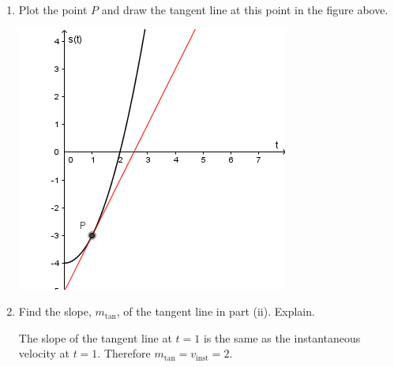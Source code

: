 \documentclass[nooutcomes]{ximera}
\begin{document}
\begin{problem}
\begin{enumerate}
\begin{enumerate}
\item
Plot the point $P$ and draw the tangent line at this point in the figure above.
\begin{freeResponse} \hfil
\begin{image}
\includegraphics[scale = .7]{Figure11.png}
\end{image}
\end{freeResponse}


\item
Find the slope, $m_{\mathrm{tan}}$, of the tangent line in part (ii).
Explain.
\begin{freeResponse}
The slope of the tangent line at $t = 1$ is the same as the instantaneous velocity at $t = 1$.
Therefore $m_{\mathrm{tan}} = v_{\mathrm{inst}} = 2$.
\end{freeResponse}
\end{enumerate}


\end{enumerate}
\end{problem} 
	
	
	
	
	
	
	

	










								
				
				
	
\end{document}
